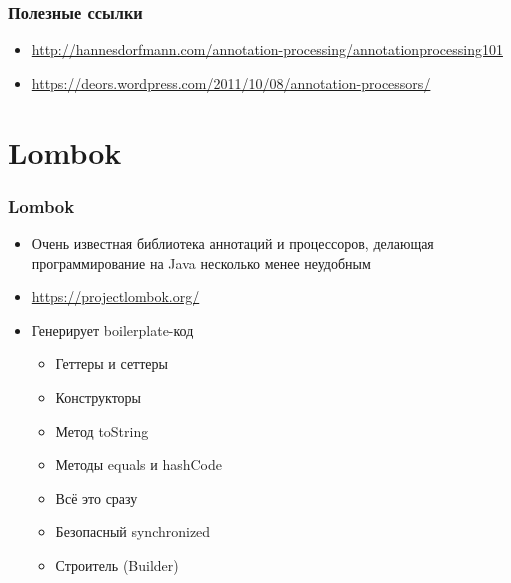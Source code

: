 \documentclass[xetex,mathserif,serif]{beamer}
\begin{document}
	\begin{frame}
		\frametitle{Полезные ссылки}
		\begin{itemize}
			\item \url{http://hannesdorfmann.com/annotation-processing/annotationprocessing101}
			\item \url{https://deors.wordpress.com/2011/10/08/annotation-processors/}
		\end{itemize}
	\end{frame}

	\section{Lombok}

	\begin{frame}
		\frametitle{Lombok}
		\begin{itemize}
			\item Очень известная библиотека аннотаций и процессоров, делающая программирование на Java несколько менее неудобным
			\item \url{https://projectlombok.org/}
			\item Генерирует boilerplate-код
			\begin{itemize}
				\item Геттеры и сеттеры
				\item Конструкторы
				\item Метод toString
				\item Методы equals и hashCode
				\item Всё это сразу
				\item Безопасный synchronized
				\item Строитель (Builder)
			\end{itemize}
		\end{itemize}
	\end{frame}
\end{document}
